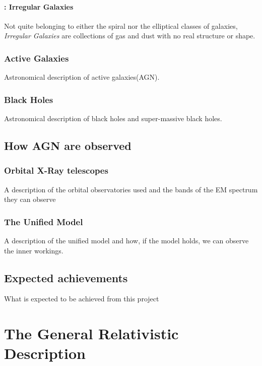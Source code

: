 \documentclass[12pt, oneside]{smuthesis}
\begin{document}
\subsubsection{: Irregular Galaxies}

Not quite belonging to either the spiral nor the elliptical classes of galaxies, \textit{Irregular Galaxies} are collections of gas and dust with no real structure or shape. 

\subsection{\sc Active Galaxies}

Astronomical description of active galaxies(AGN).

\subsection{\sc Black Holes}

Astronomical description of black holes and super-massive black holes.


\section{\sc How AGN are observed}

\subsection{\sc Orbital X-Ray telescopes}

A description of the orbital observatories used and the bands of the EM spectrum they can observe

\subsection{\sc The Unified Model}

A description of the unified model and how, if the model holds, we can observe the inner workings.

\section{\sc Expected achievements}

What is expected to be achieved from this project

\newpage

\chapter{\sc The General Relativistic Description}
\end{document}

